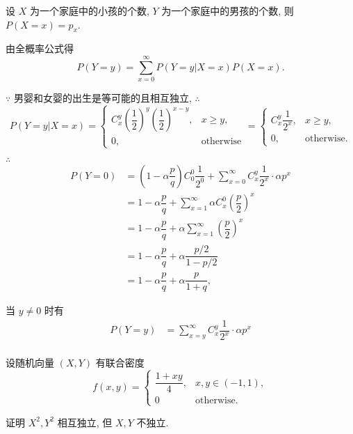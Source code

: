 \documentclass[color=black,device=normal,lang=cn]{elegantnote}
\numberwithin{equation}{section}
\theoremstyle{plain}
\numberwithin{exercise}{exsection}
\begin{document}
\begin{solution}
    设 $X$ 为一个家庭中的小孩的个数, $Y$ 为一个家庭中的男孩的个数, 则 $P(X=x)=p_x$.
    
    由全概率公式得
    \[P(Y=y)=\sum\limits_{x=0}^\infty P(Y=y|X=x)P(X=x).\]

    $\because$ 男婴和女婴的出生是等可能的且相互独立, $\therefore$
    \[P(Y=y|X=x)=\begin{cases}
        C_x^y\left(\dfrac{1}{2}\right)^y\left(\dfrac{1}{2}\right)^{x-y}, & x\geq y, \\
        0, & \text{otherwise}
    \end{cases}=\begin{cases}
        C_x^y\dfrac{1}{2^x}, & x\geq y, \\
        0, & \text{otherwise}.
    \end{cases}\]

    $\therefore$
    \begin{align*}
        P(Y=0) & =\left(1-\alpha\dfrac{p}{q}\right)C_0^0\dfrac{1}{2^0}+\sum\limits_{x=0}^\infty C_x^y\dfrac{1}{2^x}\cdot\alpha p^x \\
        & =1-\alpha\dfrac{p}{q}+\sum\limits_{x=1}^\infty\alpha C_x^0\left(\dfrac{p}{2}\right)^x \\
        & =1-\alpha\dfrac{p}{q}+\alpha\sum\limits_{x=1}^\infty\left(\dfrac{p}{2}\right)^x \\
        & =1-\alpha\dfrac{p}{q}+\alpha\dfrac{p/2}{1-p/2} \\
        & =1-\alpha\dfrac{p}{q}+\alpha\dfrac{p}{1+q},
    \end{align*}

    当 $y\neq0$ 时有
    \begin{align*}
        P(Y=y) & =\sum\limits_{x=y}^\infty C_x^y\dfrac{1}{2^x}\cdot\alpha p^x \\
    \end{align*}
\end{solution}
\begin{exercise}%
    设随机向量 $(X,Y)$ 有联合密度
    \[f(x,y)=\begin{cases}
        \dfrac{1+xy}{4}, & x,y\in(-1,1), \\[6pt]
        0 & \text{otherwise}.
    \end{cases}\]

    证明 $X^2,Y^2$ 相互独立, 但 $X,Y$ 不独立.
\end{exercise}
\end{document}
